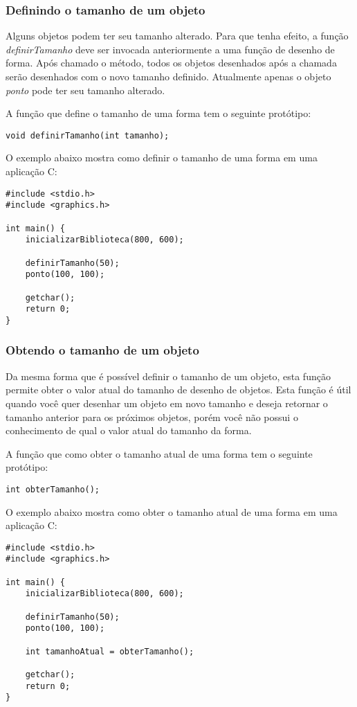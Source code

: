 \documentclass[12pt, %
openright,
oneside, %
a4paper,    %
brazil]{facom-ufu-abntex2}
\begin{document}
\subsubsection{Definindo o tamanho de um objeto}
Alguns objetos podem ter seu tamanho alterado. Para que tenha efeito, a função \textit{definirTamanho} deve ser invocada anteriormente a uma função de desenho de forma. Após chamado o método, todos os objetos desenhados após a chamada serão desenhados com o novo tamanho definido. Atualmente apenas o objeto \textit{ponto} pode ter seu tamanho alterado.

A função que define o tamanho de uma forma tem o seguinte protótipo:

\begin{verbatim}
void definirTamanho(int tamanho);
\end{verbatim}

O exemplo abaixo mostra como definir o tamanho de uma forma em uma aplicação C:

\begin{verbatim}
#include <stdio.h>
#include <graphics.h>

int main() {
    inicializarBiblioteca(800, 600);

    definirTamanho(50);
    ponto(100, 100);

    getchar();
    return 0;
}
\end{verbatim}

\subsubsection{Obtendo o tamanho de um objeto}
Da mesma forma que é possível definir o tamanho de um objeto, esta função permite obter o valor atual do tamanho de desenho de objetos. Esta função é útil quando você quer desenhar um objeto em novo tamanho e deseja retornar o tamanho anterior para os próximos objetos, porém você não possui o conhecimento de qual o valor atual do tamanho da forma.

A função que como obter o tamanho atual de uma forma tem o seguinte protótipo:

\begin{verbatim}
int obterTamanho();
\end{verbatim}

O exemplo abaixo mostra como obter o tamanho atual de uma forma em uma aplicação C:

\begin{verbatim}
#include <stdio.h>
#include <graphics.h>

int main() {
    inicializarBiblioteca(800, 600);

    definirTamanho(50);
    ponto(100, 100);

    int tamanhoAtual = obterTamanho();

    getchar();
    return 0;
}
\end{verbatim}
\end{document}
